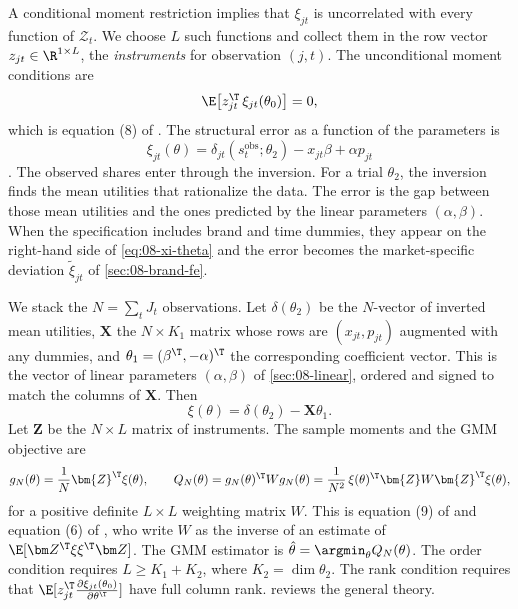 A conditional moment restriction implies that $\xi_{jt}$ is uncorrelated with every function of
$\mathcal{Z}_t$. We choose $L$ such functions and collect them in the row vector $z_{jt} \in \R^{1\times L}$,
the \emph{instruments} for observation $(j,t)$. The unconditional moment conditions are
\begin{equation}\label{eq:08-moments}
  \E\big[z_{jt}^\T\,\xi_{jt}(\theta_0)\big] = 0,
\end{equation}
which is equation (8) of \citet{Nevo2000a}. The structural error as a function of the parameters is
\begin{equation}\label{eq:08-xi-theta}
  \xi_{jt}(\theta) = \delta_{jt}(s^{\text{obs}}_t;\theta_2) - x_{jt}\beta + \alpha p_{jt}
\end{equation}
\citep[eq.~13]{Nevo2000a}. The observed shares enter through the inversion. For a trial $\theta_2$, the
inversion finds the mean utilities that rationalize the data. The error is the gap between those mean
utilities and the ones predicted by the linear parameters $(\alpha, \beta)$. When the specification includes
brand and time dummies, they appear on the right-hand side of \eqref{eq:08-xi-theta} and the error becomes the
market-specific deviation $\tilde\xi_{jt}$ of \cref{sec:08-brand-fe}.

We stack the $N = \sum_t J_t$ observations. Let $\delta(\theta_2)$ be the $N$-vector of inverted mean
utilities, $\bm{X}$ the $N \times K_1$ matrix whose rows are $(x_{jt}, p_{jt})$ augmented with any dummies,
and $\theta_1 = (\beta^\T, -\alpha)^\T$ the corresponding coefficient vector. This is the vector of linear
parameters $(\alpha, \beta)$ of \cref{sec:08-linear}, ordered and signed to match the columns of $\bm{X}$. Then
\begin{equation*}
  \xi(\theta) = \delta(\theta_2) - \bm{X}\theta_1.
\end{equation*}
Let $\bm{Z}$ be the $N \times L$ matrix of instruments. The sample moments and the GMM objective are
\begin{equation}\label{eq:08-gmm-obj}
  g_N(\theta) = \frac{1}{N}\bm{Z}^\T\xi(\theta), \qquad
  Q_N(\theta) = g_N(\theta)^\T W g_N(\theta) = \frac{1}{N^2}\,\xi(\theta)^\T\bm{Z}W\bm{Z}^\T\xi(\theta),
\end{equation}
for a positive definite $L \times L$ weighting matrix $W$. This is equation (9) of \citet{Nevo2000a} and
equation (6) of \citet{Nevo2001}, who write $W$ as the inverse of an estimate of $\E[\bm Z^\T\xi\xi^\T\bm Z]$.
The GMM estimator is $\hat\theta = \argmin_\theta Q_N(\theta)$. The order condition
requires $L \geq K_1 + K_2$, where $K_2 = \dim\theta_2$. The rank condition requires that
$\E[z_{jt}^\T\frac{\partial \xi_{jt}(\theta_0)}{\partial \theta^\T}]$ have full column rank.
 reviews the general theory.

